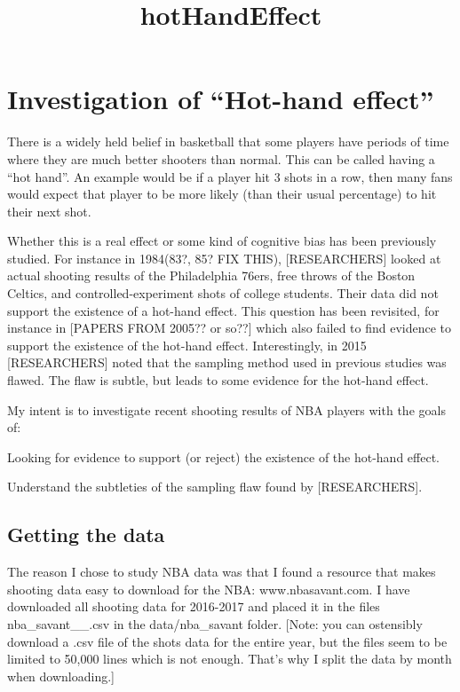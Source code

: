 \documentclass{article}
\title{hotHandEffect}
\begin{document}
    
    
    \maketitle
    
    

    

    \section{Investigation of ``Hot-hand effect''}


    There is a widely held belief in basketball that some players have
periods of time where they are much better shooters than normal. This
can be called having a ``hot hand''. An example would be if a player hit
3 shots in a row, then many fans would expect that player to be more
likely (than their usual percentage) to hit their next shot.

Whether this is a real effect or some kind of cognitive bias has been
previously studied. For instance in 1984(83?, 85? FIX THIS),
{[}RESEARCHERS{]} looked at actual shooting results of the Philadelphia
76ers, free throws of the Boston Celtics, and controlled-experiment
shots of college students. Their data did not support the existence of a
hot-hand effect. This question has been revisited, for instance in
{[}PAPERS FROM 2005?? or so??{]} which also failed to find evidence to
support the existence of the hot-hand effect. Interestingly, in 2015
{[}RESEARCHERS{]} noted that the sampling method used in previous
studies was flawed. The flaw is subtle, but leads to some evidence for
the hot-hand effect.

My intent is to investigate recent shooting results of NBA players with
the goals of:

Looking for evidence to support (or reject) the existence of the
hot-hand effect.

Understand the subtleties of the sampling flaw found by
{[}RESEARCHERS{]}.


    \subsection{Getting the data}


    The reason I chose to study NBA data was that I found a resource that
makes shooting data easy to download for the NBA: www.nbasavant.com. I
have downloaded all shooting data for 2016-2017 and placed it in the
files nba\_savant\_\_.csv in the data/nba\_savant folder. {[}Note: you
can ostensibly download a .csv file of the shots data for the entire
year, but the files seem to be limited to 50,000 lines which is not
enough. That's why I split the data by month when downloading.{]}
\end{document}
